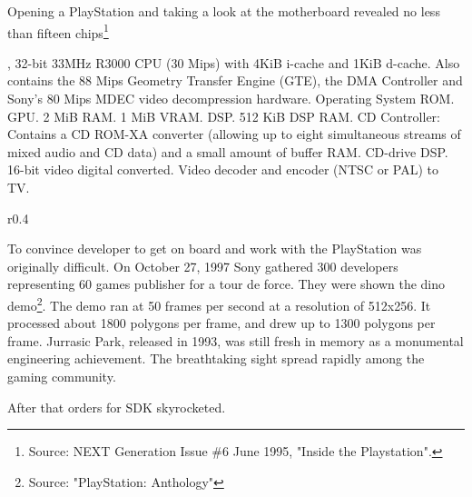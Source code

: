\par
Opening a PlayStation and taking a look at the motherboard revealed no less than fifteen chips\footnote{Source: NEXT Generation Issue \#6 June 1995, "Inside the Playstation".}\\
\par
{}, 32-bit 33MHz R3000 CPU (30 Mips) with  4KiB i-cache and 1KiB d-cache. Also contains the 88 Mips Geometry Transfer Engine (GTE), the DMA Controller and Sony's 80 Mips MDEC video decompression hardware.
 Operating System ROM.
 GPU.
 2 MiB RAM.
 1 MiB VRAM.
 DSP.
 512 KiB DSP RAM.
 CD Controller: Contains a CD ROM-XA converter (allowing up to eight simultaneous streams of mixed audio and CD data) and a small amount of buffer RAM.
 CD-drive DSP.
 16-bit video digital converted.
 Video decoder and encoder (NTSC or PAL) to TV.


\par
\begin{wrapfigure}[10]{r}{0.4\textwidth}{
\centering {}}
\end{wrapfigure}
To convince developer to get on board and work with the PlayStation was originally difficult. On October 27, 1997 Sony gathered 300 developers representing 60 games publisher for a tour de force. They were shown the dino demo\footnote{Source: "PlayStation: Anthology"}. The demo ran at 50 frames per second at a resolution of 512x256. It processed about 1800 polygons per frame, and drew up to 1300 polygons per frame. Jurrasic Park, released in 1993, was still fresh in memory as a monumental engineering achievement. The breathtaking sight spread rapidly among the gaming community.\\
\par
 After that orders for SDK skyrocketed.
 
 






